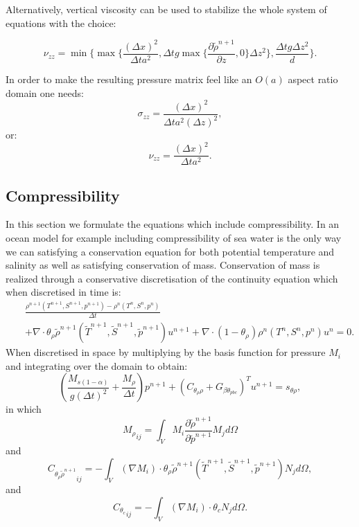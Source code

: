 Alternatively, vertical viscosity can be used to stabilize the
whole system of equations with the choice:


\begin{equation}
\nu_{zz}=\min\{\max\{\frac{(\Delta x)^2}{\Delta t a^2},
\Delta t g \max\{\frac{\partial \tilde \rho^{n+1}}{\partial z}, 0\}
 \Delta z^2 \},
\frac{\Delta t g \Delta z^2}{d} \}.
\label{nu}
\end{equation}

In order to make the resulting pressure matrix feel like an $O(a)$
aspect ratio domain one needs:
\begin{equation}
\sigma_{zz}= \frac{(\Delta x)^2}{\Delta t a^2 (\Delta z)^2},
\label{sigma_z_for_order_one}
\end{equation}
or:
\begin{equation}
\nu_{zz}= \frac{(\Delta x)^2}{\Delta t a^2 }.
\label{nu_z_for_order_one}
\end{equation}




\subsection{Compressibility}
\noindent
In this section we formulate the equations which include compressibility.
In an ocean model for example including compressibility
of sea water is the only way we can satisfying a conservation
equation for both potential temperature and salinity
as well as satisfying conservation of mass. Conservation of
mass is realized through a
conservative discretisation of the continuity equation which
when discretised in time is:
\begin{eqnarray}
&&
\frac{\rho^{n+1}( T^{n+1}, S^{n+1}, p^{n+1}) - \rho^{n}( T^{n}, S^{n}, p^{n})}
{\Delta t}
 \nonumber\\
&&
+
\nabla \cdot \theta_{\rho} \tilde  \rho^{n+1}
( \tilde T^{n+1}, \tilde S^{n+1}, \tilde p^{n+1}) u^{n+1}
+
\nabla \cdot (1-\theta_{\rho}) \rho^{n}
(  T^{n},  S^{n},  p^{n}) u^{n} =0.
\label{div-u-row-time-disc}
\end{eqnarray}
When discretised in space by multiplying by the basis
function for pressure $M_i$ and integrating over the domain
to obtain:
\begin{equation}
\left(\frac{M_{s(1-\alpha)}}{g (\Delta t)^2}+\frac{M_{\rho}}{\Delta t}\right)  p^{n+1} + (C_{\theta_\rho \rho} +G_{\beta\theta_{pbc}} )^T u^{n+1} = s_{\theta\rho},
\label{div-u-row-time-disc-space}
\end{equation}
in which
\begin{equation}
{M_{\rho}}_{ij}
=\int_V M_i \frac{\partial \tilde\rho^{n+1}}{\partial \tilde p^{n+1}}M_j d \Omega
\label{m-rho}
\end{equation}
and
\begin{equation}
{C_{\theta_\rho \tilde  \rho^{n+1}}}_{ij}
=-\int_V  (\nabla M_i )\cdot \theta_{\rho} \tilde  \rho^{n+1}
( \tilde T^{n+1}, \tilde S^{n+1}, \tilde p^{n+1})  N_j d \Omega,
\label{c-rho}
\end{equation}
and
\begin{equation}
{C_{\theta_c}}_{ij}
=-\int_V  (\nabla M_i )\cdot \theta_{c}  N_j d \Omega.
\label{c-c}
\end{equation}

